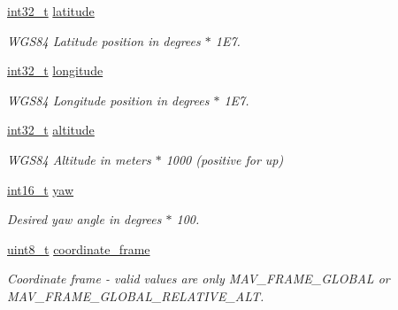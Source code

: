 \begin{DoxyCompactItemize}
\item 
\hyperlink{group___n_a_m_e_gafd12020da5a235dfcf0c3c748fb5baed}{int32\-\_\-t} \hyperlink{struct____mavlink__global__position__setpoint__int__t_a7b02635b701aa77624372077915df167}{latitude}
\begin{DoxyCompactList}\small\item\em W\-G\-S84 Latitude position in degrees $\ast$ 1\-E7. \end{DoxyCompactList}\item 
\hyperlink{group___n_a_m_e_gafd12020da5a235dfcf0c3c748fb5baed}{int32\-\_\-t} \hyperlink{struct____mavlink__global__position__setpoint__int__t_a290bd746e9d22250d7a9396afbc8a8b9}{longitude}
\begin{DoxyCompactList}\small\item\em W\-G\-S84 Longitude position in degrees $\ast$ 1\-E7. \end{DoxyCompactList}\item 
\hyperlink{group___n_a_m_e_gafd12020da5a235dfcf0c3c748fb5baed}{int32\-\_\-t} \hyperlink{struct____mavlink__global__position__setpoint__int__t_a73aa1270e7a36b8b86857221366b5a4d}{altitude}
\begin{DoxyCompactList}\small\item\em W\-G\-S84 Altitude in meters $\ast$ 1000 (positive for up) \end{DoxyCompactList}\item 
\hyperlink{stdint_8h_aa343fa3b3d06292b959ffdd4c4703b06}{int16\-\_\-t} \hyperlink{struct____mavlink__global__position__setpoint__int__t_ab4e559ebe301ccdb64580e34febf2d86}{yaw}
\begin{DoxyCompactList}\small\item\em Desired yaw angle in degrees $\ast$ 100. \end{DoxyCompactList}\item 
\hyperlink{stdint_8h_aba7bc1797add20fe3efdf37ced1182c5}{uint8\-\_\-t} \hyperlink{struct____mavlink__global__position__setpoint__int__t_aca893671888c2856ff4e8d67a267d3ac}{coordinate\-\_\-frame}
\begin{DoxyCompactList}\small\item\em Coordinate frame -\/ valid values are only M\-A\-V\-\_\-\-F\-R\-A\-M\-E\-\_\-\-G\-L\-O\-B\-A\-L or M\-A\-V\-\_\-\-F\-R\-A\-M\-E\-\_\-\-G\-L\-O\-B\-A\-L\-\_\-\-R\-E\-L\-A\-T\-I\-V\-E\-\_\-\-A\-L\-T. \end{DoxyCompactList}\end{DoxyCompactItemize}


